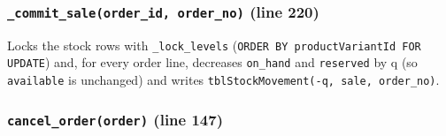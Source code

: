\hypertarget{commit_saleorder_id-order_no-line-220}{%
\subsubsection{\texorpdfstring{\texttt{\_\allowbreak{}commit\_\allowbreak{}sale(\allowbreak{}order\_\allowbreak{}id,\allowbreak{} order\_\allowbreak{}no)}
(line
220)}{\_commit\_sale(order\_id, order\_no) (line 220)}}\label{commit_saleorder_id-order_no-line-220}}

Locks the stock rows with \texttt{\_\allowbreak{}lock\_\allowbreak{}levels}
(\texttt{ORDER BY productVariantId FOR UPDATE}) and, for every order
line, decreases \texttt{on\_\allowbreak{}hand} and \texttt{reserved} by q (so
\texttt{available} is unchanged) and writes
\texttt{tblStockMovement(\allowbreak{}-q,\allowbreak{} \textquotesingle{}sale\textquotesingle{},\allowbreak{} order\_\allowbreak{}no)}.

\hypertarget{cancel_orderorder-line-147}{%
\subsubsection{\texorpdfstring{\texttt{cancel\_\allowbreak{}order(\allowbreak{}order)} (line
147)}{cancel\_order(order) (line 147)}}\label{cancel_orderorder-line-147}}

